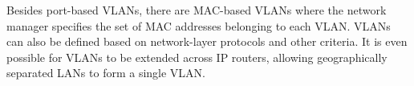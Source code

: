 \noindent Besides port-based VLANs, there are MAC-based VLANs where the network manager specifies the set of MAC addresses belonging to each VLAN. VLANs can also be defined based on network-layer protocols and other criteria. It is even possible for VLANs to be extended across IP routers, allowing geographically separated LANs to form a single VLAN.

